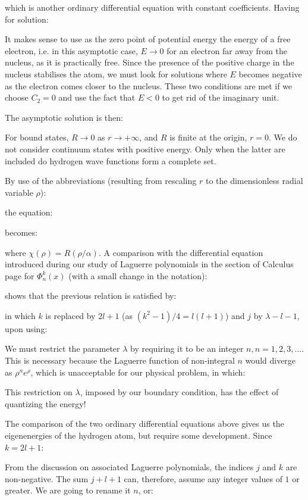 	which is another ordinary differential equation with constant coefficients. Having for solution:
	
	
	It makes sense to use as the zero point of potential energy the energy of a free electron, i.e. in this asymptotic case, $E \rightarrow 0$ for an electron far away from the nucleus, as it is practically free. Since the presence of the positive charge in the nucleus stabilises the atom, we must look for solutions where $E$ becomes negative as the electron comes closer to the nucleus. These two conditions are met if we choose $C_{2}=0$ and use the fact that $E<0$ to get rid of the imaginary unit.
	
	The asymptotic solution is then:
	
	For bound states, $R \rightarrow 0$ as $r \rightarrow +\infty$, and $R$ is finite at the origin, $r=0$. We do not consider continuum states with positive energy. Only when the latter are included do hydrogen wave functions form a complete set.
	
	By use of the abbreviations (resulting from rescaling $r$ to the dimensionless radial variable $\rho$):
	
	the equation:
	
	becomes:
	
	where $\chi(\rho)=R(\rho / \alpha)$. A comparison with the differential equation introduced during our study of Laguerre polynomials in the section of Calculus page \pageref{radial term dimensionless non-rigid rotator} for $\Phi_{n}^{k}(x)$ (with a small change in the notation):
	
	 shows that the previous relation is satisfied by:
	
	in which $k$ is replaced by $2 l+1$ (as $(k^2-1)/4=l(l+1)$) and $j$ by $\lambda-l-1$, upon using:
	
	We must restrict the parameter $\lambda$ by requiring it to be an integer $n, n=1,2,3, \ldots$. This is necessary because the Laguerre function of non-integral $n$ would diverge as $\rho^{n} e^{\rho}$, which is unacceptable for our physical problem, in which:
	
	This restriction on $\lambda$, imposed by our boundary condition, has the effect of quantizing the energy! 
	
	The comparison of the two ordinary differential equations above gives us the eigenenergies of the hydrogen atom, but require some development. Since $k=2 l+1$:
	
	From the discussion on associated Laguerre polynomials, the indices $j$ and $k$ are non-negative. The sum $j+l+1$ can, therefore, assume any integer values of $1$ or greater. We are going to rename it $n$, or:
	
